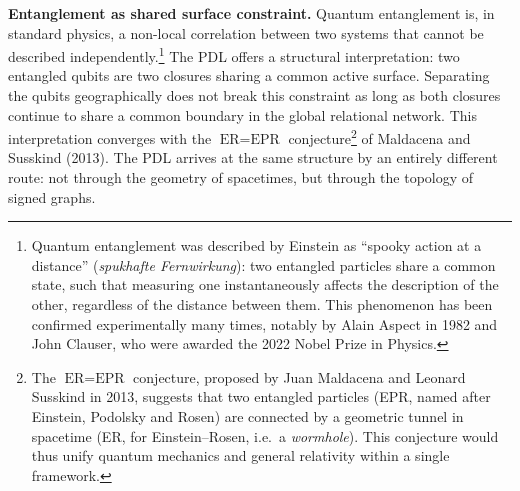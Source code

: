 \documentclass[12pt, a4paper, openright]{book}
\begin{document}
\medskip

\textbf{Entanglement as shared surface constraint.} Quantum entanglement is, in standard physics, a non-local correlation between two systems that cannot be described independently.\footnote{Quantum entanglement was described by Einstein as ``spooky action at a distance'' (\textit{spukhafte Fernwirkung}): two entangled particles share a common state, such that measuring one instantaneously affects the description of the other, regardless of the distance between them. This phenomenon has been confirmed experimentally many times, notably by Alain Aspect in 1982 and John Clauser, who were awarded the 2022 Nobel Prize in Physics.} The PDL offers a structural interpretation: two entangled qubits are two closures sharing a common active surface. Separating the qubits geographically does not break this constraint as long as both closures continue to share a common boundary in the global relational network. This interpretation converges with the $\text{ER} = \text{EPR}$ conjecture\footnote{The $\text{ER} = \text{EPR}$ conjecture, proposed by Juan Maldacena and Leonard Susskind in 2013, suggests that two entangled particles (EPR, named after Einstein, Podolsky and Rosen) are connected by a geometric tunnel in spacetime (ER, for Einstein--Rosen, i.e.\ a \textit{wormhole}). This conjecture would thus unify quantum mechanics and general relativity within a single framework.} of Maldacena and Susskind (2013). The PDL arrives at the same structure by an entirely different route: not through the geometry of spacetimes, but through the topology of signed graphs.

\medskip
\end{document}
